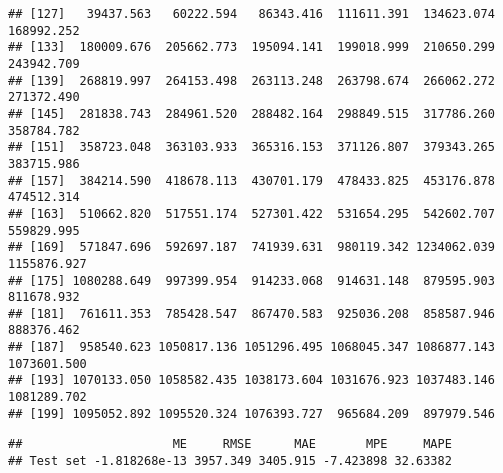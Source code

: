 \documentclass[
]{article}
\newenvironment{Shaded}{\begin{snugshade}}{\end{snugshade}}
\newcommand{\AttributeTok}[1]{\textcolor[rgb]{0.13,0.29,0.53}{#1}}
\newcommand{\DecValTok}[1]{\textcolor[rgb]{0.00,0.00,0.81}{#1}}
\newcommand{\FunctionTok}[1]{\textcolor[rgb]{0.13,0.29,0.53}{\textbf{#1}}}
\newcommand{\NormalTok}[1]{#1}
\newcommand{\OtherTok}[1]{\textcolor[rgb]{0.56,0.35,0.01}{#1}}
\newcommand{\SpecialCharTok}[1]{\textcolor[rgb]{0.81,0.36,0.00}{\textbf{#1}}}
\newcommand{\StringTok}[1]{\textcolor[rgb]{0.31,0.60,0.02}{#1}}
\begin{document}
\begin{verbatim}
## [127]   39437.563   60222.594   86343.416  111611.391  134623.074  168992.252
## [133]  180009.676  205662.773  195094.141  199018.999  210650.299  243942.709
## [139]  268819.997  264153.498  263113.248  263798.674  266062.272  271372.490
## [145]  281838.743  284961.520  288482.164  298849.515  317786.260  358784.782
## [151]  358723.048  363103.933  365316.153  371126.807  379343.265  383715.986
## [157]  384214.590  418678.113  430701.179  478433.825  453176.878  474512.314
## [163]  510662.820  517551.174  527301.422  531654.295  542602.707  559829.995
## [169]  571847.696  592697.187  741939.631  980119.342 1234062.039 1155876.927
## [175] 1080288.649  997399.954  914233.068  914631.148  879595.903  811678.932
## [181]  761611.353  785428.547  867470.583  925036.208  858587.946  888376.462
## [187]  958540.623 1050817.136 1051296.495 1068045.347 1086877.143 1073601.500
## [193] 1070133.050 1058582.435 1038173.604 1031676.923 1037483.146 1081289.702
## [199] 1095052.892 1095520.324 1076393.727  965684.209  897979.546
\end{verbatim}

\begin{Shaded}
\end{Shaded}

\begin{verbatim}
##                     ME     RMSE      MAE       MPE     MAPE
## Test set -1.818268e-13 3957.349 3405.915 -7.423898 32.63382
\end{verbatim}

\begin{Shaded}
\end{Shaded}
\end{document}
